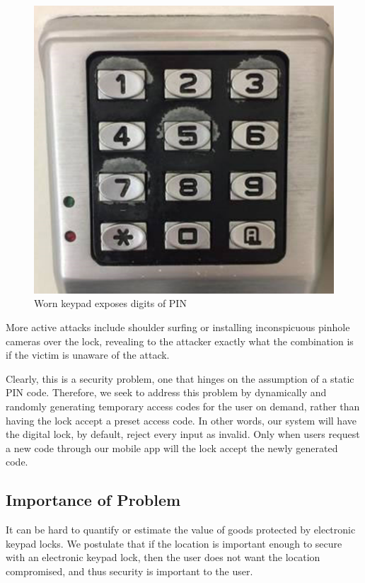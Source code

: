 \documentclass[conference]{IEEEtran}
\begin{document}
\begin{figure}[h!]
  \includegraphics[width=\linewidth]{worn_lock.png}
  \caption{Worn keypad exposes digits of PIN}
  \label{fig:wornlock}
\end{figure}

More active attacks include shoulder surfing or installing inconspicuous pinhole cameras over the lock, revealing to the attacker exactly what the combination is if the victim is unaware of the attack. 

Clearly, this is a security problem, one that hinges on the assumption of a static PIN code. Therefore, we seek to address this problem by dynamically and randomly generating temporary access codes for the user on demand, rather than having the lock accept a preset access code. In other words, our system will have the digital lock, by default, reject every input as invalid. Only when users request a new code through our mobile app will the lock accept the newly generated code.

\subsection{Importance of Problem}
It can be hard to quantify or estimate the value of goods protected by electronic keypad locks. We postulate that if the location is important enough to secure with an electronic keypad lock, then the user does not want the location compromised, and thus security is important to the user. 
\end{document}
